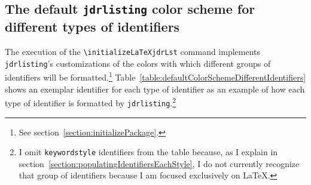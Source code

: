 \documentclass[12pt,table,final]{article}%
\begin{document}
\subsection{The default \lstinline|jdrlisting| color scheme for different types of identifiers}
The execution of the \lstinline|\initializeLaTeXjdrLst| command implements \lstinline|jdrlisting|'s customizations of the colors with which different groups of identifiers will be formatted.\footnote{See section~\ref{section:initializePackage}.} Table~\ref{table:defaultColorSchemeDifferentIdentifiers} shows an exemplar identifier for each type of identifier as an example of how each type of identifier is formatted by \lstinline|jdrlisting|.\footnote{I omit \lstinline|keywordstyle| identifiers from the table because, as I explain in section~\ref{section:populatingIdentifiersEachStyle}, I do not currently recognize that group of identifiers because I am focused exclusively on \LaTeX.}
\end{document}
